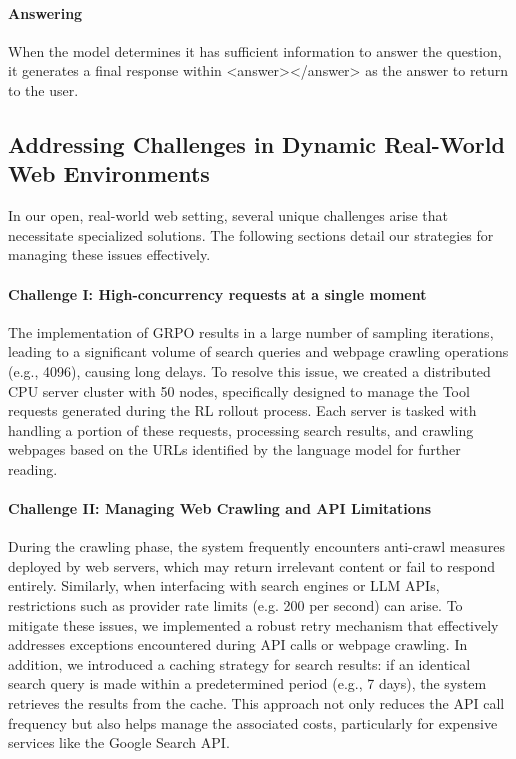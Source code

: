 \documentclass{article}
\begin{document}
\paragraph{Answering}
When the model determines it has sufficient information to answer the question, it generates a final response within \textless answer\textgreater \textless/answer\textgreater
 as the answer to return to the user.

\subsection{Addressing Challenges in Dynamic Real-World Web Environments}
In our open, real-world web setting, several unique challenges arise that necessitate specialized solutions. The following sections detail our strategies for managing these issues effectively.

\paragraph{Challenge I: High-concurrency requests at a single moment}

The implementation of GRPO results in a large number of sampling iterations, leading to a significant volume of search queries and webpage crawling operations (e.g., 4096), causing long delays. To resolve this issue, we created a distributed CPU server cluster with 50 nodes, specifically designed to manage the Tool requests generated during the RL rollout process. Each server is tasked with handling a portion of these requests, processing search results, and crawling webpages based on the URLs identified by the language model for further reading.

\paragraph{Challenge II: Managing Web Crawling and API Limitations}

During the crawling phase, the system frequently encounters anti-crawl measures deployed by web servers, which may return irrelevant content or fail to respond entirely. Similarly, when interfacing with search engines or LLM APIs, restrictions such as provider rate limits (e.g. 200 per second) can arise. To mitigate these issues, we implemented a robust retry mechanism that effectively addresses exceptions encountered during API calls or webpage crawling. In addition, we introduced a caching strategy for search results: if an identical search query is made within a predetermined period (e.g., 7 days), the system retrieves the results from the cache. This approach not only reduces the API call frequency but also helps manage the associated costs, particularly for expensive services like the Google Search API.
\end{document}
